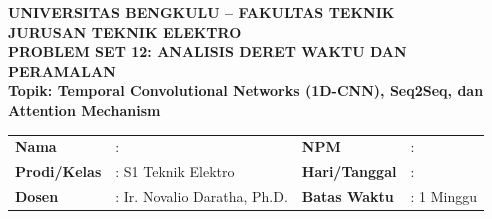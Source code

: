 \documentclass[11pt,a4paper]{article}
\begin{document}
\begin{center}
    {\large \textbf{\color{primaryblue}UNIVERSITAS BENGKULU -- FAKULTAS TEKNIK}}\\[0.1cm]
    {\large \textbf{\color{secondaryblue}JURUSAN TEKNIK ELEKTRO}}\\[0.2cm]
    {\LARGE \textbf{\color{primaryblue}PROBLEM SET 12: ANALISIS DERET WAKTU DAN PERAMALAN}}\\[0.1cm]
    {\normalsize \textbf{Topik: Temporal Convolutional Networks (1D-CNN), Seq2Seq, dan Attention Mechanism}}
\end{center}

\vspace{0.1cm}

\begin{tcolorbox}[colback=boxbg,colframe=primaryblue,arc=2mm,title=\textbf{Informasi Tugas \& Identitas Mahasiswa}]
\small
\begin{tabular}{p{2.2cm}p{5.5cm}p{2.2cm}p{5.0cm}}
\textbf{Nama} & : \dotfill & \textbf{NPM} & : \dotfill \\
\textbf{Prodi/Kelas} & : S1 Teknik Elektro & \textbf{Hari/Tanggal} & : \dotfill \\
\textbf{Dosen} & : Ir. Novalio Daratha, Ph.D. & \textbf{Batas Waktu} & : 1 Minggu \\
\end{tabular}
\end{tcolorbox}

\vspace{0.2cm}
\end{document}
